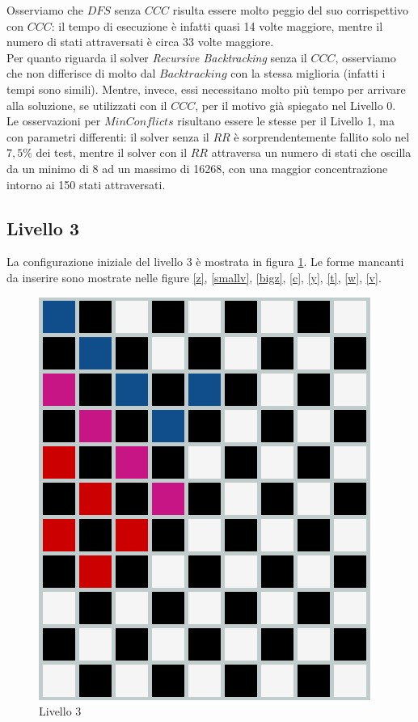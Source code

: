 Osserviamo che $DFS$ senza $CCC$ risulta essere molto peggio del suo corrispettivo con $CCC$: il tempo di esecuzione è infatti quasi 14 volte maggiore, mentre il numero di stati attraversati è circa 33 volte maggiore.\\

Per quanto riguarda il solver \textit{Recursive Backtracking} senza il $CCC$, osserviamo che non differisce di molto dal $Backtracking$ con la stessa miglioria (infatti i tempi sono simili). Mentre, invece, essi necessitano molto più tempo per arrivare alla soluzione, se utilizzati con il $CCC$, per il motivo già spiegato nel Livello 0.\\

Le osservazioni per $MinConflicts$ risultano essere le stesse per il Livello 1, ma con parametri differenti: il solver senza il $RR$ è sorprendentemente fallito solo nel $7,5\%$ dei test, mentre il solver con il $RR$ attraversa un numero di stati che oscilla da un minimo di 8 ad un massimo di 16268, con una maggior concentrazione intorno ai 150 stati attraversati.

\subsection{Livello 3}
La configurazione iniziale del livello 3 è mostrata in figura \ref{lev3}. Le forme mancanti da inserire sono mostrate nelle figure \ref{z}, \ref{smallv}, \ref{bigz}, \ref{c}, \ref{y}, \ref{t}, \ref{w}, \ref{v}.
\begin{figure}[h]
	\centering
	\includegraphics[scale=0.3]{immagini/lv3}
	\caption{Livello 3}
	\label{lev3}
\end{figure}
\\
\noindent


